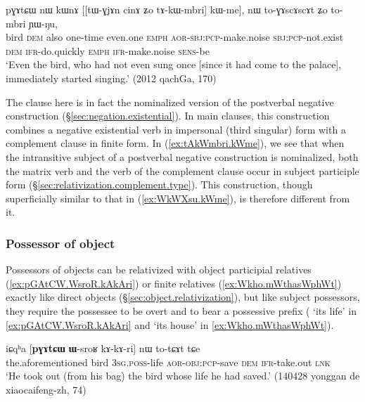 \begin{exe}
\ex \label{ex:tAkWmbri.kWme}
 \gll  pɣɤtɕɯ nɯ kɯnɤ [[tɯ-ɣjɤn cinɤ ʑo tɤ-kɯ-mbri] kɯ-me], nɯ to-ɣɤscɤscɤt ʑo to-mbri ɲɯ-ŋu, \\
bird \textsc{dem} also one-time even.one \textsc{emph} \textsc{aor}-\textsc{sbj}:\textsc{pcp}-make.noise \textsc{sbj}:\textsc{pcp}-not.exist \textsc{dem} \textsc{ifr}-do.quickly \textsc{emph} \textsc{ifr}-make.noise \textsc{sens}-be \\
\glt `Even the bird, who had not even sung once [since it had come to the palace], immediately started singing.' (2012 qachGa, 170)
 \end{exe}

The clause  here is in fact the nominalized version of the postverbal negative construction  (§\ref{sec:negation.existential}). In main clauses, this construction combines a negative existential verb in impersonal (third singular) form with a complement clause in finite form. In (\ref{ex:tAkWmbri.kWme}), we see that when the intransitive subject of a postverbal negative construction is nominalized, both the matrix verb  and the verb of the complement clause  occur in subject participle form (§\ref{sec:relativization.complement.type}). This construction, though superficially similar to that in (\ref{ex:WkWXsu.kWme}), is therefore different from it.


\subsubsection{Possessor of object}  \label{sec:O.possessor.relativization}
Possessors of objects can be relativized with object participial relatives (\ref{ex:pGAtCW.WsroR.kAkAri}) or finite relatives (\ref{ex:Wkho.mWthasWphWt}) exactly like direct objects (§\ref{sec:object.relativization}), but like subject possessors, they require the possessee to be overt and to bear a possessive prefix ( `its life' in \ref{ex:pGAtCW.WsroR.kAkAri} and  `its house' in \ref{ex:Wkho.mWthasWphWt}).

\begin{exe}
\ex \label{ex:pGAtCW.WsroR.kAkAri}
\gll iɕqʰa [\textbf{pɣɤtɕɯ} \textbf{ɯ}-sroʁ kɤ-kɤ-ri] nɯ to-tɕɤt tɕe \\
the.aforementioned bird  \textsc{3sg}.\textsc{poss}-life \textsc{aor}-\textsc{obj}:\textsc{pcp}-save \textsc{dem} \textsc{ifr}-take.out \textsc{lnk} \\
\glt `He took out (from his bag) the bird whose life he had saved.' (140428 yonggan de xiaocaifeng-zh, 74)
\end{exe}

